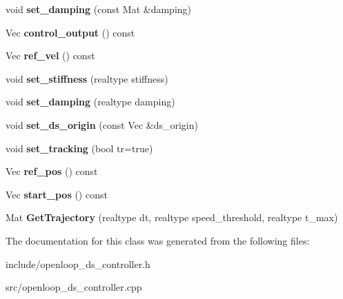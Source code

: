 \begin{DoxyCompactItemize}
\item 
\hypertarget{classOpenloopDSController_a5559588a34847313b7666529dd84f940}{void {\bfseries set\+\_\+damping} (const Mat \&damping)}\label{classOpenloopDSController_a5559588a34847313b7666529dd84f940}

\item 
\hypertarget{classOpenloopDSController_ab565ec9870c28c4983e376db3c1dcec8}{Vec {\bfseries control\+\_\+output} () const }\label{classOpenloopDSController_ab565ec9870c28c4983e376db3c1dcec8}

\item 
\hypertarget{classOpenloopDSController_afcf3b176c4161f9c85aebd28f5ada680}{Vec {\bfseries ref\+\_\+vel} () const }\label{classOpenloopDSController_afcf3b176c4161f9c85aebd28f5ada680}

\item 
\hypertarget{classOpenloopDSController_a9b5e46e1de075e0fe55f7a4f664b4589}{void {\bfseries set\+\_\+stiffness} (realtype stiffness)}\label{classOpenloopDSController_a9b5e46e1de075e0fe55f7a4f664b4589}

\item 
\hypertarget{classOpenloopDSController_a4ed9ebe4d3a5354429e054c49d61d763}{void {\bfseries set\+\_\+damping} (realtype damping)}\label{classOpenloopDSController_a4ed9ebe4d3a5354429e054c49d61d763}

\item 
\hypertarget{classOpenloopDSController_aedee982482d0885f048a489302001408}{void {\bfseries set\+\_\+ds\+\_\+origin} (const Vec \&ds\+\_\+origin)}\label{classOpenloopDSController_aedee982482d0885f048a489302001408}

\item 
\hypertarget{classOpenloopDSController_afaebf4d9445600c952449d612c7a7d86}{void {\bfseries set\+\_\+tracking} (bool tr=true)}\label{classOpenloopDSController_afaebf4d9445600c952449d612c7a7d86}

\item 
\hypertarget{classOpenloopDSController_a1c6022ae0934c14d783181054789f52c}{Vec {\bfseries ref\+\_\+pos} () const }\label{classOpenloopDSController_a1c6022ae0934c14d783181054789f52c}

\item 
\hypertarget{classOpenloopDSController_a1b9ac7b80c4d2f2801cab5c9dc475411}{Vec {\bfseries start\+\_\+pos} () const }\label{classOpenloopDSController_a1b9ac7b80c4d2f2801cab5c9dc475411}

\item 
\hypertarget{classOpenloopDSController_a8dde85ac7f6a138b33709ed15634eef6}{Mat {\bfseries Get\+Trajectory} (realtype dt, realtype speed\+\_\+threshold, realtype t\+\_\+max)}\label{classOpenloopDSController_a8dde85ac7f6a138b33709ed15634eef6}

\end{DoxyCompactItemize}


The documentation for this class was generated from the following files\+:\begin{DoxyCompactItemize}
\item 
include/openloop\+\_\+ds\+\_\+controller.\+h\item 
src/openloop\+\_\+ds\+\_\+controller.\+cpp\end{DoxyCompactItemize}
